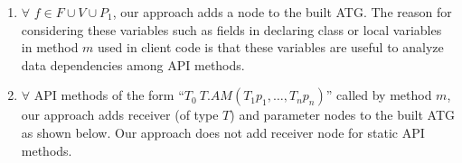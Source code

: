 %


\begin{enumerate}\vspace*{-2ex}
\item $\forall$ $f \in F \cup V \cup P_1$, our approach adds a node to the built ATG.
The reason for considering these variables such as fields in
declaring class or local variables in method $m$ used in client code
is that these variables are useful to analyze data dependencies
among API methods.\vspace*{-2ex}
\item $\forall$ API methods of the form ``$T_0\ T.AM (T_1 p_1, \ldots, T_n p_n)$''
called by method $m$, our approach adds receiver (of type $T$) and
parameter nodes to the built ATG as shown below. Our approach does
not add receiver node for static API methods. \vspace*{-3ex}
\begin{center}

\end{center}
\end{enumerate}

